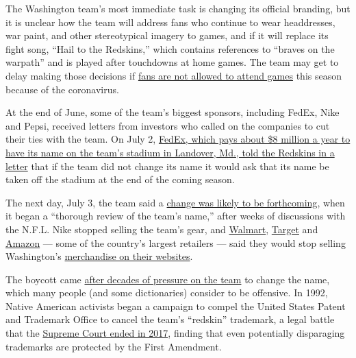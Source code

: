 The Washington team's most immediate task is changing its official
branding, but it is unclear how the team will address fans who continue
to wear headdresses, war paint, and other stereotypical imagery to
games, and if it will replace its fight song, ``Hail to the Redskins,''
which contains references to ``braves on the warpath'' and is played
after touchdowns at home games. The team may get to delay making those
decisions if
\href{https://www.nytimes3xbfgragh.onion/2020/07/02/sports/football/nfl-salary-cap-no-fans.html}{fans
are not allowed to attend games} this season because of the coronavirus.

At the end of June, some of the team's biggest sponsors, including
FedEx, Nike and Pepsi, received letters from investors who called on the
companies to cut their ties with the team. On July 2,
\href{https://www.nytimes3xbfgragh.onion/2020/07/10/sports/football/dan-snyder-washington-redskins-name-fedex.html}{FedEx,
which pays about \$8 million a year to have its name on the team's
stadium in Landover, Md., told the Redskins in a letter} that if the
team did not change its name it would ask that its name be taken off the
stadium at the end of the coming season.

The next day, July 3, the team said a
\href{https://www.nytimes3xbfgragh.onion/2020/07/03/sports/football/washington-redskins-nickname-nfl.html?smid=tw-share}{change
was likely to be forthcoming}, when it began a ``thorough review of the
team's name,'' after weeks of discussions with the N.F.L. Nike stopped
selling the team's gear, and
\href{https://twitter.com/WalmartInc/status/1279141523867734016?s=20}{Walmart},
\href{https://www.barrons.com/articles/target-walmart-pull-washington-redskins-merchandise-from-online-stores-51594053993}{Target}
and
\href{https://www.usatoday.com/story/money/2020/07/09/washington-redskins-amazon-stop-selling-merchandise/5404092002/}{Amazon}
--- some of the country's largest retailers --- said they would stop
selling Washington's
\href{https://www.walmart.com/cp/nfl-fan-shop/1423455?search_redirect=true\&redirect_query=redskins\&redirectQuery=redskins}{merchandise
on their websites}.

The boycott came
\href{https://www.nytimes3xbfgragh.onion/2013/10/10/sports/football/redskins-name-change-remains-her-unfinished-business.html}{after
decades of pressure on the team} to change the name, which many people
(and some dictionaries) consider to be offensive. In 1992, Native
American activists began a campaign to compel the United States Patent
and Trademark Office to cancel the team's ``redskin'' trademark, a legal
battle that the
\href{https://www.nytimes3xbfgragh.onion/2017/06/19/sports/supreme-court-offensive-names-sports-teams.html}{Supreme
Court ended in 2017}, finding that even potentially disparaging
trademarks are protected by the First Amendment.

